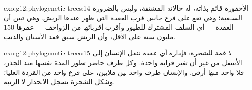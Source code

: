 \begin{solution}{exo:g12:phylogenetic-trees:14}
الأحفورة  قائم بذاته، له حالاته المشتقة، وليس بالضرورة 
السلفية؛ وهي تقع على فرع جانبي قرب العقدة التي ظهر عندها الريش. وهي
تبين أن العقدة --- أي السلف المشترك للطيور وأقرب أقربائها من الزواحف
--- عمرها 150 مليون سنة على الأقل، وأن الريش سبق فقد الأسنان والذنب.
\end{solution}

\begin{solution}{exo:g12:phylogenetic-trees:15}
لا قمة للشجرة: فإدارة أي عقدة تنقل الإنسان إلى الأسفل من غير أن تغير
قرابة واحدة. وكل طرف حاضر تطور المدة نفسها منذ الجذر، فلا واحد منها
أرقى. والإنسان طرف واحد بين ملايين، على فرع واحد من القردة العليا؛
وشكل الشجرة يسجل الانحدار لا الرتبة.
\end{solution}

